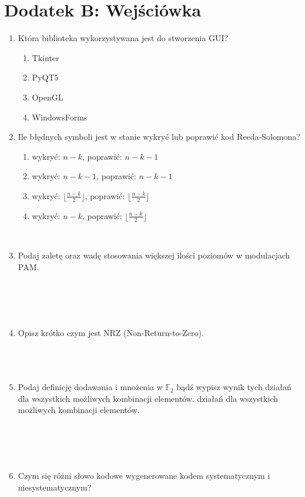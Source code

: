 \setcounter{secnumdepth}{0}
\section*{Dodatek B: Wejściówka}

\begin{enumerate}
    \item Która biblioteka wykorzystywana jest do stworzenia GUI?
    \begin{enumerate}[label=\Alph*)]
        \item Tkinter
        \item PyQT5
        \item OpenGL
        \item WindowsForms
    \end{enumerate}

\item Ile błędnych symboli jest w stanie wykryć lub poprawić kod Reeda-Solomona?
    \begin{enumerate}[label=\Alph*)]
        \item wykryć: $n-k$, poprawić: $n-k-1$
        \item wykryć: $n-k-1$, poprawić: $n-k-1$
        \item wykryć: $\lfloor \frac{n-k}{2} \rfloor$, poprawić: $\lfloor \frac{n-k}{2} \rfloor$
        \item wykryć: $n-k$, poprawić: $\lfloor \frac{n-k}{2} \rfloor$
    \end{enumerate}\\

\item Podaj zaletę oraz wadę stosowania większej ilości poziomów w modulacjach PAM.\\ \\ \\ \\ \\
\item Opisz krótko czym jest NRZ (Non-Return-to-Zero).\\ \\ \\ \\
\item Podaj definicję dodawania i mnożenia w $\mathbb{F}_2$ bądź wypisz wynik tych działań dla wszystkich możliwych kombinacji elementów.
działań dla wszystkich możliwych kombinacji elementów.\\ \\ \\ \\ \\
\item Czym się różni słowo kodowe wygenerowane kodem systematycznym i niesystematycznym?
\end{enumerate}